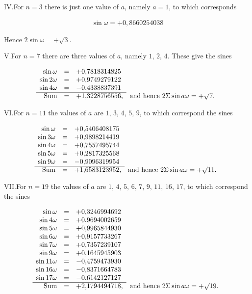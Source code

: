 IV.\quad For $n=3$ there is just one value of $a$, namely $a=1$, to which corresponds

\[
\begin{aligned}
\sin\omega=+0{,}8660254038
\end{aligned}
\]

Hence $2\sin\omega=+\surd3$.

V.\quad For $n=7$ there are three values of $a$, namely $1$, $2$, $4$. These give the sines

{\small\setlength{\arraycolsep}{2.5pt}\renewcommand{\arraystretch}{1.15}
\[
\begin{array}{rcll}
\sin\omega&=&+0{,}7818314825&\\
\sin2\omega&=&+0{,}9749279122&\\
\sin4\omega&=&-0{,}4338837391&\\\cline{1-3}
\text{Sum}&=&+1{,}3228756556,&\text{and hence }2\Sigma\sin a\omega=+\surd7.
\end{array}
\]
}

VI.\quad For $n=11$ the values of $a$ are $1$, $3$, $4$, $5$, $9$, to which correspond the sines

{\small\setlength{\arraycolsep}{2.5pt}\renewcommand{\arraystretch}{1.15}
\[
\begin{array}{rcll}
\sin\omega&=&+0{,}5406408175&\\
\sin3\omega&=&+0{,}9898214419&\\
\sin4\omega&=&+0{,}7557495744&\\
\sin5\omega&=&+0{,}2817325568&\\
\sin9\omega&=&-0{,}9096319954&\\\cline{1-3}
\text{Sum}&=&+1{,}6583123952,&\text{and hence }2\Sigma\sin a\omega=+\surd11.
\end{array}
\]
}

VII.\quad For $n=19$ the values of $a$ are $1$, $4$, $5$, $6$, $7$, $9$, $11$, $16$, $17$, to which correspond the sines

{\small\setlength{\arraycolsep}{2.5pt}\renewcommand{\arraystretch}{1.15}
\[
\begin{array}{rcll}
\sin\omega&=&+0{,}3246994692&\\
\sin4\omega&=&+0{,}9694002659&\\
\sin5\omega&=&+0{,}9965844930&\\
\sin6\omega&=&+0{,}9157733267&\\
\sin7\omega&=&+0{,}7357239107&\\
\sin9\omega&=&+0{,}1645945903&\\
\sin11\omega&=&-0{,}4759473930&\\
\sin16\omega&=&-0{,}8371664783&\\
\sin17\omega&=&-0{,}6142127127&\\\cline{1-3}
\text{Sum}&=&+2{,}1794494718,&\text{and hence }2\Sigma\sin a\omega=+\surd19.
\end{array}
\]
}

